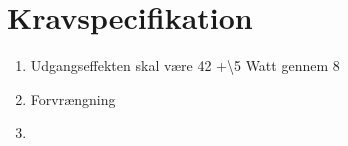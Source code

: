 \chapter{Kravspecifikation}

\begin{enumerate}
\item Udgangseffekten skal være 42 +\backslash 5 Watt gennem 8\Omega
\item Forvrængning
\item 
\end{enumerate}
